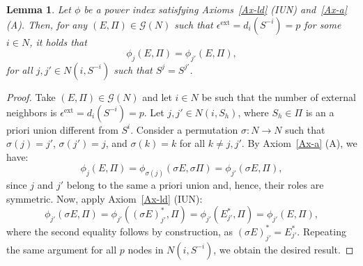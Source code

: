 \documentclass[preprint,11pt,authoryear]{elsarticle}
\theoremstyle{plain}
\newtheorem{lemma}[theorem]{Lemma}
\begin{document}
\begin{lemma}\label{lemma:IUN+A}
	Let $\phi$ be a power index satisfying Axioms~\ref{Ax-ld} (IUN) and~\ref{Ax-a} (A).  
	Then, for any $(E,\Pi)\in\mathcal{G}(N)$ such that $\epsilon^{\mathrm{ext}} = d_i(S^{-i}) = p$ for some $i\in N$, it holds that
	\begin{equation*}
		\phi_j(E,\Pi) = \phi_{j'}(E,\Pi),
	\end{equation*}
	for all $j, j' \in N(i,S^{-i})$ such that $S^{j} = S^{j'}$.
\end{lemma}
\begin{proof}
	Take $(E,\Pi)\in\mathcal{G}(N)$ and let $i\in N$ be such that the number of external neighbors is $\epsilon^{\mathrm{ext}} = d_i(S^{-i}) = p$. 
	Let $j, j' \in N(i, S_h)$, where $S_h \in \Pi$ is an a priori union different from $S^i$.
	Consider a permutation $\sigma : N \to N$ such that $\sigma(j) = j'$, $\sigma(j') = j$, and $\sigma(k) = k$ for all $k \neq j, j'$. 
	By Axiom~\ref{Ax-a} (A), we have:
	\[
	\phi_{j}(E,\Pi) = \phi_{\sigma(j)}(\sigma E, \sigma \Pi) = \phi_{j'}(\sigma E, \Pi),
	\]
	since $j$ and $j'$ belong to the same a priori union and, hence, their roles are symmetric.
	Now, apply Axiom~\ref{Ax-ld} (IUN): 
	\[
	\phi_{j'}(\sigma E, \Pi) = \phi_{j'}((\sigma E)^*_{j'}, \Pi) = \phi_{j'}(E_{j'}^*, \Pi) = \phi_{j'}(E, \Pi),
	\]
	where the second equality follows by construction, as $(\sigma E)^*_{j'} = E_{j'}^*$.
	Repeating the same argument for all $p$ nodes in $N(i, S^{-i})$, we obtain the desired result.
\end{proof}
\end{document}
